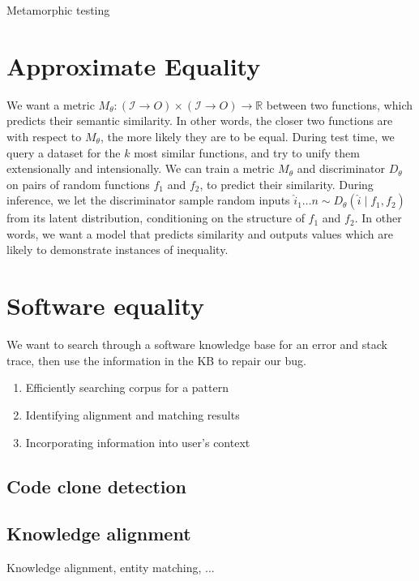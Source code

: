 \documentclass[11pt]{article}
\begin{document}
    Metamorphic testing

    \section{Approximate Equality}

    We want a metric $M_\theta: (\mathcal{I}\rightarrow{O}) \times (\mathcal{I}\rightarrow{O})\rightarrow \mathbb{R}$ between two functions, which predicts their semantic similarity. In other words, the closer two functions are with respect to $M_\theta$, the more likely they are to be equal. During test time, we query a dataset for the $k$ most similar functions, and try to unify them extensionally and intensionally. We can train a metric $M_\theta$ and discriminator $D_\theta$ on pairs of random functions $f_1$ and $f_2$, to predict their similarity. During inference, we let the discriminator sample random inputs $\hat i_1 \ldots n \sim D_\theta(\hat i \mid f_1, f_2)$ from its latent distribution, conditioning on the structure of $f_1$ and $f_2$. In other words, we want a model that predicts similarity and outputs values which are likely to demonstrate instances of inequality.

    \section{Software equality}

    We want to search through a software knowledge base for an error and stack trace, then use the information in the KB to repair our bug.

    \begin{enumerate}
        \item Efficiently searching corpus for a pattern
        \item Identifying alignment and matching results
        \item Incorporating information into user's context
    \end{enumerate}


    \subsection{Code clone detection}

    \subsection{Knowledge alignment}

    Knowledge alignment, entity matching, ...
\end{document}
